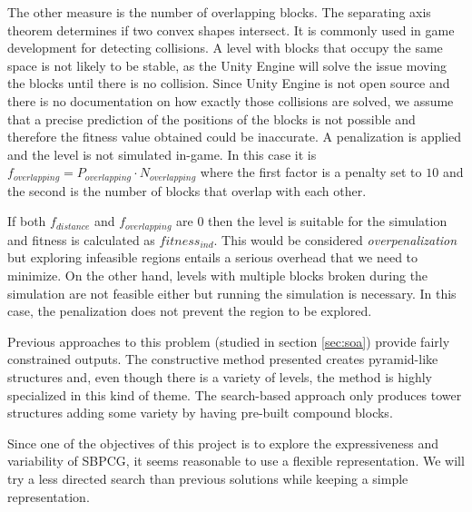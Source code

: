 \documentclass[runningheads,a4paper]{llncs}
\begin{document}


The other measure is the number of overlapping blocks. The separating axis 
theorem\cite{ericson2004real} determines if two convex shapes intersect. It is 
commonly used in game development for detecting collisions. A level with blocks 
that occupy the same space is not likely to be stable, as the Unity Engine will 
solve the issue moving the blocks until there is no collision. Since Unity 
Engine is not open source and there is no documentation on how exactly those 
collisions are solved, we assume that a precise prediction of the positions of 
the blocks is not possible and therefore the fitness value obtained could be 
inaccurate. A penalization is applied and the level is not simulated in-game. 
In this case it is $f_{overlapping} = P_{overlapping} \cdot N_{overlapping}$ 
where the first factor is a penalty set to $10$ and the second is the number of 
blocks that overlap with each other. 

If both $f_{distance}$ and $f_{overlapping}$ are $0$ then the level is suitable 
for the simulation and fitness is calculated as $fitness_{ind}$. This would be 
considered \textit{overpenalization} but exploring infeasible regions entails a 
serious overhead that we need to minimize. On the other hand, levels with 
multiple blocks broken during the simulation are not feasible either but 
running the simulation is necessary. In this case, the penalization does not 
prevent the region to be explored.

Previous approaches to this problem (studied in section \ref{sec:soa}) provide 
fairly constrained outputs. The constructive method presented creates 
pyramid-like structures and, even though there is a variety of levels, the 
method is highly specialized in this kind of theme. The search-based approach 
only produces tower structures adding some variety by having pre-built compound 
blocks.

Since one of the objectives of this project is to explore the expressiveness 
and variability of SBPCG, it seems reasonable to use a flexible representation. 
We will try a less directed search than previous solutions while keeping a 
simple representation. 
\end{document}
